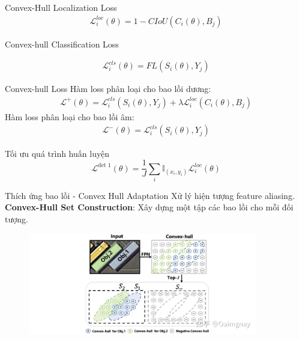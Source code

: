 \documentclass[11pt]{beamer}
\theoremstyle{definition}
\theoremstyle{plain}
\theoremstyle{plain}
\theoremstyle{remark}
\begin{document}
	
	\begin{frame}{Convex-Hull Localization Loss}
		\begin{align} \label{ptdd0}
			\mathcal{L}_i^{loc} (\theta) = 1 - CIoU(C_i(\theta), B_j)
		\end{align}
		
	\end{frame}
	\begin{frame}{Convex-hull Classification Loss}
	
		\begin{align} \label{ptdd1}
			\mathcal{L}	_i^{cls} (\theta) =FL(S_i(\theta), Y_j) 
		\end{align}
	
	\end{frame}
	\begin{frame}{Convex-hull Loss}
		Hàm loss phân loại cho bao lồi dương:\\
		\begin{align} \label{ptdd2}
			\mathcal{L}^+ (\theta) = 	\mathcal{L}_i^{cls}(S_i(\theta), Y_j) +\lambda 	\mathcal{L}_i^{loc}(C_i(\theta), B_j)
		\end{align}
		Hàm loss phân loại cho bao lồi âm:\\
		\begin{align} \label{ptdd3}
			\mathcal{L}^- (\theta) = \mathcal{L}_i^{cls}(S_i(\theta), Y_j) 
		\end{align}
		
	\end{frame}
	\begin{frame}{Tối ưu quá trình huấn luyện}
		\begin{equation}
			\mathcal{L}^{\text {det } 1}(\theta)=\frac{1}{J} \sum_i \mathbb{I}_{\left(x_i, y_i\right)} \mathcal{L}_i^{l o c}(\theta)
		\end{equation}
	\end{frame}
	\begin{frame}{Thích ứng bao lồi - Convex Hull Adaptation}
		Xử lý hiện tượng feature aliasing. \\
		\textbf{Convex-Hull Set Construction}: Xây dựng một tập các bao lồi cho mỗi đối tượng.
		\begin{figure}[ht!]
			\begin{center}
				\includegraphics[width=10cm]{./Hinh_8.jpg}
			\end{center}
		\end{figure}
	\end{frame}
	
\end{document}

